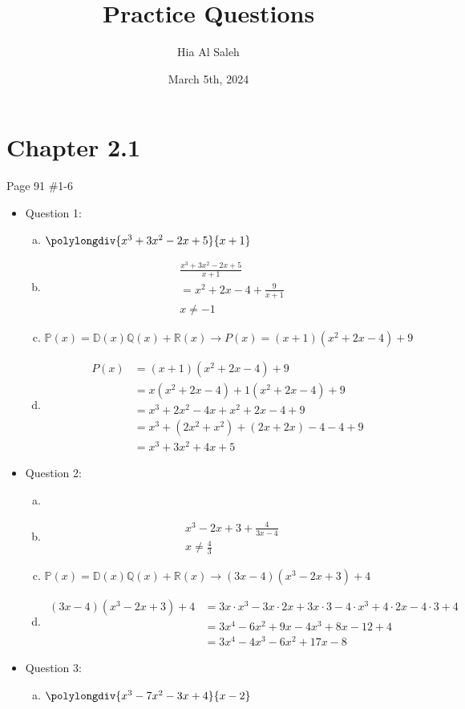 \documentclass{article}
\title{Practice Questions}
\author{Hia Al Saleh}
\date{March 5th, 2024}
\begin{document}
\maketitle
\section*{Chapter 2.1}
Page 91 \#1-6
\begin{itemize}
\item Question 1:
\begin{enumerate}[a)]
    \item \(\polylongdiv{x^3 + 3x^2 - 2x + 5}{x + 1}\)
    
    \item \begin{align*}
        &\frac{x^3 + 3x^2 - 2x + 5}{x + 1}\\
        &=x^2+2x-4+\frac{9}{x + 1}\\
        &\boxed{x \neq -1}
    \end{align*}
    
    \item \(\mathbb{P}(x)=\mathbb{D}(x)\mathbb{Q}(x)+\mathbb{R}(x)\longrightarrow P(x)=(x+1)(x^2+2x-4)+9\)
    
    \item \begin{align*}
        P(x) &= (x+1)(x^2 + 2x - 4) + 9 \\
        &= x(x^2 + 2x - 4) + 1(x^2 + 2x - 4) + 9 \\
        &= x^3 + 2x^2 - 4x + x^2 + 2x - 4 + 9 \\
        &= x^3 + (2x^2 + x^2) + (2x + 2x) - 4 - 4 + 9 \\
        &= x^3 + 3x^2 + 4x + 5
    \end{align*}
\end{enumerate}
\newpage
\item Question 2:
\begin{enumerate}[a)]
\item {}
\item \begin{align*}
    &x^3-2x+3+\frac{4}{3x-4}\\
    &\boxed{x \neq \frac{4}{3}}
\end{align*}
\item $\mathbb{P}(x)=\mathbb{D}(x)\mathbb{Q}(x)+\mathbb{R}(x) \longrightarrow (3x-4)(x^3-2x+3)+4$
\item \begin{align*}
(3x-4)(x^3-2x+3)+4 &= 3x \cdot x^3 - 3x \cdot 2x + 3x \cdot 3 - 4 \cdot x^3 + 4 \cdot 2x - 4 \cdot 3 + 4 \\
&= 3x^4 - 6x^2 + 9x - 4x^3 + 8x - 12 + 4 \\
&= 3x^4 - 4x^3 - 6x^2 + 17x - 8
\end{align*}
\end{enumerate}
\item Question 3:
\begin{enumerate}[a)]
    \item \(\polylongdiv{x^3 - 7x^2 - 3x + 4}{x - 2}\)
    

\end{enumerate}
\end{itemize}
\end{document}
